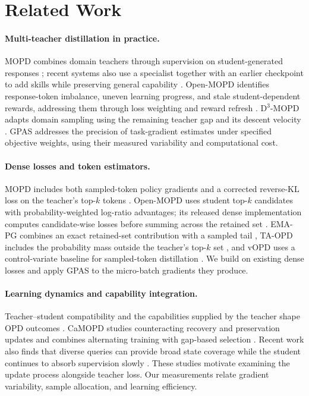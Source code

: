 \section{Related Work}

\paragraph{Multi-teacher distillation in practice.}
MOPD combines domain teachers through supervision on student-generated
responses \citep{ma2026mopdmultiteacheronpolicydistillation}; recent systems
also use a specialist together with an earlier checkpoint to add skills
while preserving general capability \citep{liu2026instella}.
Open-MOPD identifies response-token imbalance, uneven learning progress,
and stale student-dependent rewards, addressing them through loss weighting
and reward refresh \citep{gao2026openmopddiagnosingfixingcapability}.
D$^3$-MOPD adapts domain sampling using the remaining teacher gap and its
descent velocity \citep{sun2026d3mopd}. GPAS addresses the precision of
task-gradient estimates under specified objective weights, using their
measured variability and computational cost.

\paragraph{Dense losses and token estimators.}
MOPD includes both sampled-token policy gradients and a corrected reverse-KL
loss on the teacher's top-$k$ tokens
\citep{ma2026mopdmultiteacheronpolicydistillation}. Open-MOPD uses student
top-$k$ candidates with probability-weighted log-ratio advantages; its
released dense implementation computes candidate-wise losses before
summing across the retained set
\citep{gao2026openmopddiagnosingfixingcapability,openmopd2026code}.
EMA-PG combines an exact retained-set contribution with a sampled tail
\citep{zhang2026emapg}, TA-OPD includes the probability mass outside the
teacher's top-$k$ set \citep{huang2026tailaware}, and vOPD uses a
control-variate baseline for sampled-token distillation
\citep{oh2026vopd}. We build on existing dense losses and apply GPAS to the
micro-batch gradients they produce.

\paragraph{Learning dynamics and capability integration.}
Teacher--student compatibility and the capabilities supplied by the teacher
shape OPD outcomes \citep{li2026rethinkingopd}.
CaMOPD studies counteracting recovery and preservation updates and combines
alternating training with gap-based selection \citep{chen2026camopd}.
Recent work also finds that diverse queries can provide broad state coverage
while the student continues to absorb supervision slowly
\citep{fu2026rethinkingopd2}. These studies motivate examining the update
process alongside teacher loss. Our measurements relate gradient
variability, sample allocation, and learning efficiency.

